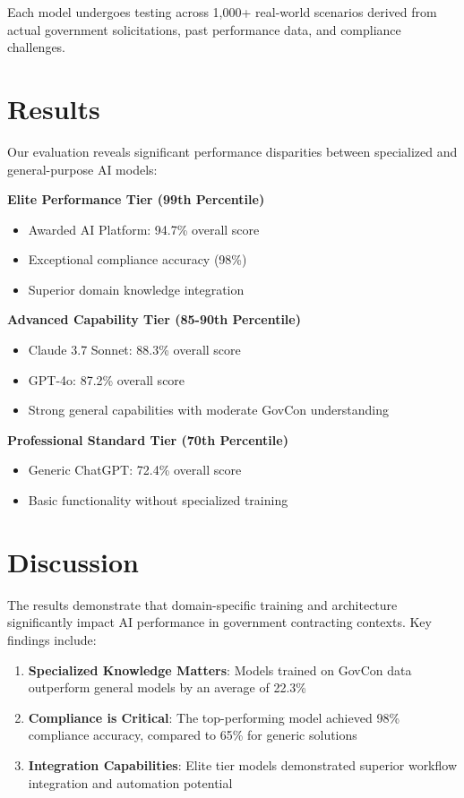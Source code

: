 \documentclass[11pt,a4paper]{article}
\begin{document}
Each model undergoes testing across 1,000+ real-world scenarios derived from actual government solicitations, past performance data, and compliance challenges.

\section{Results}
Our evaluation reveals significant performance disparities between specialized and general-purpose AI models:

\textbf{Elite Performance Tier (99th Percentile)}
\begin{itemize}
\item Awarded AI Platform: 94.7\% overall score
\item Exceptional compliance accuracy (98\%)
\item Superior domain knowledge integration
\end{itemize}

\textbf{Advanced Capability Tier (85-90th Percentile)}
\begin{itemize}
\item Claude 3.7 Sonnet: 88.3\% overall score
\item GPT-4o: 87.2\% overall score
\item Strong general capabilities with moderate GovCon understanding
\end{itemize}

\textbf{Professional Standard Tier (70th Percentile)}
\begin{itemize}
\item Generic ChatGPT: 72.4\% overall score
\item Basic functionality without specialized training
\end{itemize}

\section{Discussion}
The results demonstrate that domain-specific training and architecture significantly impact AI performance in government contracting contexts. Key findings include:

\begin{enumerate}
\item \textbf{Specialized Knowledge Matters}: Models trained on GovCon data outperform general models by an average of 22.3\%
\item \textbf{Compliance is Critical}: The top-performing model achieved 98\% compliance accuracy, compared to 65\% for generic solutions
\item \textbf{Integration Capabilities}: Elite tier models demonstrated superior workflow integration and automation potential
\end{enumerate}
\end{document}
